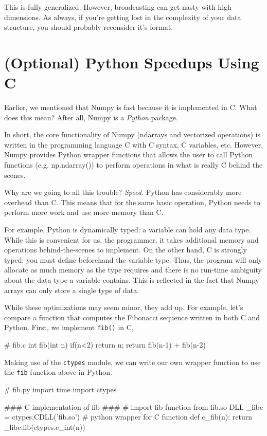 \documentclass[12pt]{article}
\numberwithin{equation}{section}
\begin{document}
   This is fully generalized. However, broadcasting can get nasty with high dimensions. As always, if you're getting lost in the complexity of your data structure, you should probably reconsider it's format. 
   
  
  \section{(Optional) Python Speedups Using C}
  
  Earlier, we mentioned that Numpy is fast because it is implemented in C. What does this mean? After all, Numpy is a \textit{Python} package. 
  
  In short, the core functionality of Numpy (ndarrays and vectorized operations) is written in the programming language C with C syntax, C variables, etc. However, Numpy provides Python wrapper functions that allows the user to call Python functions (e.g. np.ndarray()) to perform operations in what is really C behind the scenes.
  
  Why are we going to all this trouble? \textit{Speed.} Python has considerably more overhead than C. This means that for the same basic operation, Python needs to perform more work and use more memory than C. 
  
  For example, Python is dynamically typed: a variable can hold any data type. While this is convenient for us, the programmer, it takes additional memory and operations behind-the-scenes to implement. On the other hand, C is strongly typed: you must define beforehand the variable type. Thus, the program will only allocate as much memory as the type requires and there is no run-time ambiguity about the data type a variable contains. This is reflected in the fact that  Numpy arrays can only store a single type of data.
  
  While these optimizations may seem minor, they add up. For example, let's compare a function that computes the Fibonacci sequence written in both C and Python. First, we implement \verb|fib()| in C,
  
  \begin{python}
	# fib.c
	int fib(int n) {
	    if(n<2) {
	       return n;
	    }
	    return fib(n-1) + fib(n-2)
	}
  \end{python}
	
	Making use of the \verb|ctypes| module, we can write our own wrapper function to use the \verb|fib| function above in Python. 

\begin{python}
	# fib.py
	import time
	import ctypes
	
	### C implementation of fib ###
	# import fib function from fib.so DLL
	_libc = ctypes.CDLL('fib.so')
	# python wrapper for C function
	def c_fib(n):
	    return _libc.fib(ctypes.c_int(n))
	
\end{python}
\end{document}
